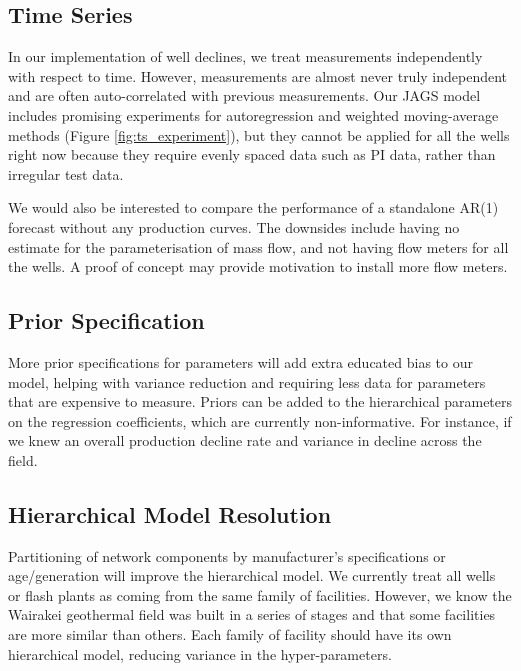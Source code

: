 \documentclass[a4paper, 12pt]{article}
\begin{document}
\subsection{Time Series}
In our implementation of well declines, we treat measurements independently with respect to time. However, measurements are almost never truly independent and are often auto-correlated with previous measurements. Our JAGS model includes promising experiments for autoregression and weighted moving-average methods (Figure \ref{fig:ts_experiment}), but they cannot be applied for all the wells right now because they require evenly spaced data such as PI data, rather than irregular test data.

We would also be interested to compare the performance of a standalone AR(1) forecast without any production curves. The downsides include having no estimate for the parameterisation of mass flow, and not having flow meters for all the wells. A proof of concept may provide motivation to install more flow meters.

\subsection{Prior Specification}
More prior specifications for parameters will add extra educated bias to our model, helping with variance reduction and requiring less data for parameters that are expensive to measure. Priors can be added to the hierarchical parameters on the regression coefficients, which are currently non-informative. For instance, if we knew an overall production decline rate and variance in decline across the field.

\subsection{Hierarchical Model Resolution}
Partitioning of network components by manufacturer's specifications or age/generation will improve the hierarchical model. We currently treat all wells or flash plants as coming from the same family of facilities. However, we know the Wairakei geothermal field was built in a series of stages and that some facilities are more similar than others. Each family of facility should have its own hierarchical model, reducing variance in the hyper-parameters.

\newpage
 
\end{document}
